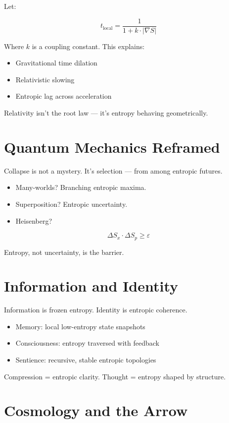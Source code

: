 \documentclass[12pt]{article}
\begin{document}
Let:

\[
t_{\text{local}} = \frac{1}{1 + k \cdot |\nabla S|}
\]

Where $k$ is a coupling constant. This explains:

\begin{itemize}
\item Gravitational time dilation
\item Relativistic slowing
\item Entropic lag across acceleration
\end{itemize}

Relativity isn't the root law — it's entropy behaving geometrically.

\section*{Quantum Mechanics Reframed}

Collapse is not a mystery. It's selection — from among entropic futures.

\begin{itemize}
\item Many-worlds? Branching entropic maxima.
\item Superposition? Entropic uncertainty.
\item Heisenberg?
\end{itemize}

\[
\Delta S_x \cdot \Delta S_p \geq \varepsilon
\]

Entropy, not uncertainty, is the barrier.

\section*{Information and Identity}

Information is frozen entropy. Identity is entropic coherence.

\begin{itemize}
\item Memory: local low-entropy state snapshots
\item Consciousness: entropy traversed with feedback
\item Sentience: recursive, stable entropic topologies
\end{itemize}

Compression = entropic clarity. Thought = entropy shaped by structure.

\section*{Cosmology and the Arrow}
\end{document}
